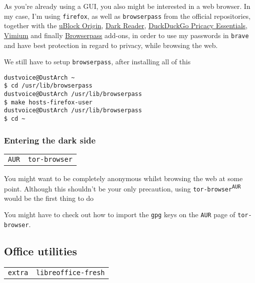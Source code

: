 \documentclass[9pt]{report}
\newenvironment{NOTE}
{\begin{tcolorbox}[colback=admonitionBG,coltitle=draculaFG,colframe=draculaBlue,colbacktitle=draculaBlue,title=NOTE]}
{\end{tcolorbox}}
\newenvironment{packagetable}
{\begin{longtabu}to \textwidth [b]{X[1,r]|X[1,l]}}
{\end{longtabu}}
\begin{document}
As you’re already using a GUI, you also might be interested in a web browser.
In my case, I’m using \texttt{firefox}, as well as \texttt{browserpass} from the official repositories, together with the \href{https://addons.mozilla.org/en-US/firefox/addon/ublock-origin/}{uBlock Origin}, \href{https://addons.mozilla.org/en-US/firefox/addon/darkreader/}{Dark Reader}, \href{https://addons.mozilla.org/en-US/firefox/addon/duckduckgo-for-firefox/}{DuckDuckGo Pricacy Essentials}, \href{https://addons.mozilla.org/en-US/firefox/addon/vimium-ff/}{Vimium} and finally \href{https://addons.mozilla.org/en-US/firefox/addon/browserpass-ce/}{Browserpass} add-ons, in order to use my passwords in \texttt{brave} and have best protection in regard to privacy, while browsing the web.


We still have to setup \texttt{browserpass}, after installing all of this


\begin{verbatim}
dustvoice@DustArch ~
$ cd /usr/lib/browserpass
dustvoice@DustArch /usr/lib/browserpass
$ make hosts-firefox-user
dustvoice@DustArch /usr/lib/browserpass
$ cd ~
\end{verbatim}


\newpage

\hypertarget{x-entering-the-dark-side}{\subsubsection{Entering the dark side}}
\begin{packagetable}
    \texttt{AUR} & \texttt{tor-browser} \\ 
\end{packagetable}

You might want to be completely anonymous whilst browsing the web at some point.
Although this shouldn’t be your only precaution, using \texttt{tor-browser\textsuperscript{\texttt{AUR}}} would be the first thing to do


\begin{NOTE}
    You might have to check out how to import the \texttt{gpg} keys on the \texttt{AUR} page of \texttt{tor-browser}.

\end{NOTE}

\newpage

\hypertarget{x-office-utilities}{\subsection{Office utilities}}
\begin{packagetable}
    \texttt{extra} & \texttt{libreoffice-fresh} \\ 
\end{packagetable}
\end{document}
